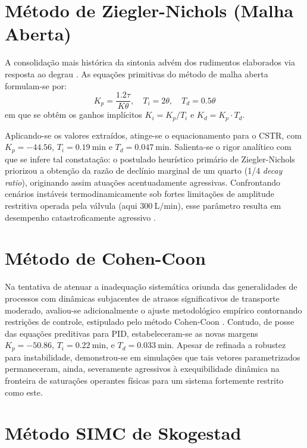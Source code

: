 \section{Método de Ziegler-Nichols (Malha Aberta)}
\label{sec:ziegler_nichols}

A consolidação mais histórica da sintonia advém dos rudimentos elaborados via resposta ao degrau \cite{ZieglerNichols1942}. As equações primitivas do método de malha aberta formulam-se por:
\begin{equation}
    K_p = \frac{1.2 \tau}{K \theta}, \quad T_i = 2\theta, \quad T_d = 0.5\theta
\end{equation}
em que se obtêm os ganhos implícitos $K_i = K_p/T_i$ e $K_d = K_p \cdot T_d$.

Aplicando-se os valores extraídos, atinge-se o equacionamento para o CSTR, com $K_p = -44.56$, $T_i = \SI{0.19}{\minute}$ e $T_d = \SI{0.047}{\minute}$. Salienta-se o rigor analítico com que se infere tal constatação: o postulado heurístico primário de Ziegler-Nichols priorizou a obtenção da razão de declínio marginal de um quarto (1/4 \textit{decay ratio}), originando assim atuações acentuadamente agressivas. Confrontando cenários instáveis termodinamicamente sob fortes limitações de amplitude restritiva operada pela válvula (aqui $300\ \si{\liter\per\minute}$), esse parâmetro resulta em desempenho catastroficamente agressivo \cite{Rivera1986}.

\section{Método de Cohen-Coon}
\label{sec:cohen_coon}

Na tentativa de atenuar a inadequação sistemática oriunda das generalidades de processos com dinâmicas subjacentes de atrasos significativos de transporte moderado, avaliou-se adicionalmente o ajuste metodológico empírico contornando restrições de controle, estipulado pelo método Cohen-Coon \cite{CohenCoon1953, Seborg2016}. 
Contudo, de posse das equações preditivas para PID, estabeleceram-se as novas margens $K_p = -50.86$, $T_i = \SI{0.22}{\minute}$, e $T_d = \SI{0.033}{\minute}$. Apesar de refinada a robustez para instabilidade, demonstrou-se em simulações que tais vetores parametrizados permaneceram, ainda, severamente agressivos à exequibilidade dinâmica na fronteira de saturações operantes físicas para um sistema fortemente restrito como este.

\section{Método SIMC de Skogestad}
\label{sec:simc}

